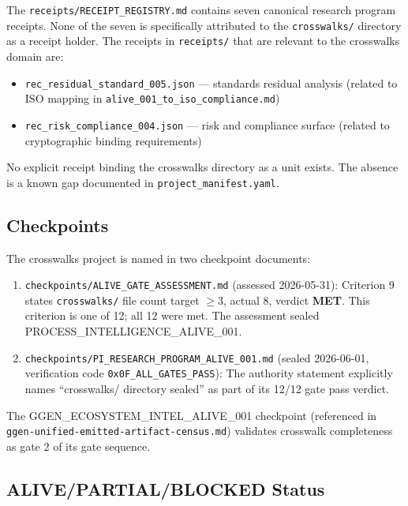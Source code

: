 The \texttt{receipts/RECEIPT\_REGISTRY.md} contains seven canonical research program receipts.
None of the seven is specifically attributed to the \texttt{crosswalks/} directory as a receipt
holder. The receipts in \texttt{receipts/} that are relevant to the crosswalks domain are:

\begin{itemize}
  \item \texttt{rec\_residual\_standard\_005.json} --- standards residual analysis (related to
        \textsc{ISO} mapping in \texttt{alive\_001\_to\_iso\_compliance.md})
  \item \texttt{rec\_risk\_compliance\_004.json} --- risk and compliance surface (related to
        cryptographic binding requirements)
\end{itemize}

No explicit receipt binding the crosswalks directory as a unit exists. The absence is a known
gap documented in \texttt{project\_manifest.yaml}.

\subsection{Checkpoints}
\label{sec:crosswalks-evidence-checkpoints}

The crosswalks project is named in two checkpoint documents:

\begin{enumerate}
  \item \texttt{checkpoints/ALIVE\_GATE\_ASSESSMENT.md} (assessed 2026-05-31): Criterion 9
        states \texttt{crosswalks/} file count target $\geq 3$, actual 8, verdict \textbf{MET}.
        This criterion is one of 12; all 12 were met. The assessment sealed
        \textsc{PROCESS\_INTELLIGENCE\_ALIVE\_001}.
  \item \texttt{checkpoints/PI\_RESEARCH\_PROGRAM\_ALIVE\_001.md} (sealed 2026-06-01,
        verification code \texttt{0x0F\_ALL\_GATES\_PASS}): The authority statement explicitly
        names ``crosswalks/ directory sealed'' as part of its 12/12 gate pass verdict.
\end{enumerate}

The \textsc{GGEN\_ECOSYSTEM\_INTEL\_ALIVE\_001} checkpoint (referenced in
\texttt{ggen-unified-emitted-artifact-census.md}) validates crosswalk completeness as gate 2
of its gate sequence.

\subsection{ALIVE/PARTIAL/BLOCKED Status}
\label{sec:crosswalks-evidence-status}

